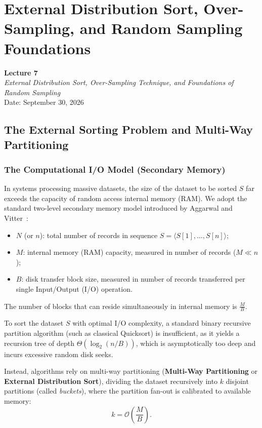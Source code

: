 \chapter{External Distribution Sort, Over-Sampling, and Random Sampling Foundations}
\label{chap:external-distribution-sort}

\begin{center}
  \textbf{Lecture 7}\\
  \emph{External Distribution Sort, Over-Sampling Technique, and Foundations of Random Sampling}\\[0.5em]
  Date: September 30, 2026
\end{center}

\section{The External Sorting Problem and Multi-Way Partitioning}
\label{sec:external-sorting-multiway}

\subsection{The Computational I/O Model (Secondary Memory)}
In systems processing massive datasets, the size of the dataset to be sorted $S$ far exceeds the capacity of random access internal memory (RAM). We adopt the standard two-level secondary memory model introduced by Aggarwal and Vitter~\cite{aggarwal1988}:
\begin{itemize}
  \item $N$ (or $n$): total number of records in sequence $S = \langle S[1], \dots, S[n] \rangle$;
  \item $M$: internal memory (RAM) capacity, measured in number of records ($M \ll n$);
  \item $B$: disk transfer block size, measured in number of records transferred per single Input/Output (I/O) operation.
\end{itemize}

The number of blocks that can reside simultaneously in internal memory is $\frac{M}{B}$.

To sort the dataset $S$ with optimal I/O complexity, a standard binary recursive partition algorithm (such as classical Quicksort) is insufficient, as it yields a recursion tree of depth $\Theta(\log_2(n/B))$, which is asymptotically too deep and incurs excessive random disk seeks.

Instead, algorithms rely on multi-way partitioning (\textbf{Multi-Way Partitioning} or \textbf{External Distribution Sort}), dividing the dataset recursively into $k$ disjoint partitions (called \textit{buckets}), where the partition fan-out is calibrated to available memory:
\begin{equation}
  k = \mathcal{O}\left(\frac{M}{B}\right).
\end{equation}


